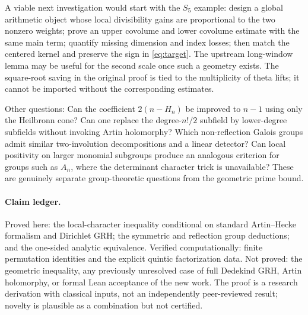 \documentclass[11pt]{article}
\theoremstyle{remark}\newtheorem{remark}[theorem]{Remark}
\begin{document}
A viable next investigation would start with the $S_5$ example: design a global arithmetic object whose local divisibility gains are proportional to the two nonzero weights; prove an upper covolume and lower covolume estimate with the same main term; quantify missing dimension and index losses; then match the centered kernel and preserve the sign in \eqref{eq:target}. The upstream long-window lemma may be useful for the second scale once such a geometry exists. The square-root saving in the original proof is tied to the multiplicity of theta lifts; it cannot be imported without the corresponding estimates.

Other questions: Can the coefficient $2(n-H_n)$ be improved to $n-1$ using only the Heilbronn cone? Can one replace the degree-$n!/2$ subfield by lower-degree subfields without invoking Artin holomorphy? Which non-reflection Galois groups admit similar two-involution decompositions and a linear detector? Can local positivity on larger monomial subgroups produce an analogous criterion for groups such as $A_n$, where the determinant character trick is unavailable? These are genuinely separate group-theoretic questions from the geometric prime bound.

\paragraph{Claim ledger.} Proved here: the local-character inequality conditional on standard Artin--Hecke formalism and Dirichlet GRH; the symmetric and reflection group deductions; and the one-sided analytic equivalence. Verified computationally: finite permutation identities and the explicit quintic factorization data. Not proved: the geometric inequality, any previously unresolved case of full Dedekind GRH, Artin holomorphy, or formal Lean acceptance of the new work. The proof is a research derivation with classical inputs, not an independently peer-reviewed result; novelty is plausible as a combination but not certified.
\end{document}

